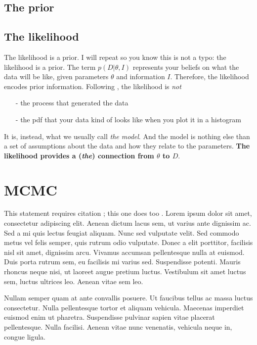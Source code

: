 \documentclass[a4paper,11pt]{article}
\begin{document}
\subsection{The prior}\label{sec:prior}

\subsection{The likelihood}\label{sec:likelihood}

The likelihood is a prior.
I will repeat so you know this is not a typo: the likelihood is a prior.
The term $p(D|\theta,I)$ represents your beliefs on what the data will be like, given parameters $\theta$ and information $I$.
Therefore, the likelihood encodes prior information.
%
Following \cite{Brewer2013}, the likelihood is \emph{not} 
\begin{itemize}
	\item[-] the process that generated the data
	\item[-] the pdf that your data kind of looks like when you plot it in a histogram
\end{itemize}

It is, instead, what we usually call \emph{the model}.
And the model is nothing else than a set of assumptions about the data and how they relate to the parameters.
\textbf{The likelihood provides a (\emph{the}) connection from $\theta$ to $D$}.




\section{MCMC}

This statement requires citation \cite{Smith:2012qr}; this one does too \cite{Smith:2013jd}. Lorem ipsum dolor sit amet, consectetur adipiscing elit. Aenean dictum lacus sem, ut varius ante dignissim ac. Sed a mi quis lectus feugiat aliquam. Nunc sed vulputate velit. Sed commodo metus vel felis semper, quis rutrum odio vulputate. Donec a elit porttitor, facilisis nisl sit amet, dignissim arcu. Vivamus accumsan pellentesque nulla at euismod. Duis porta rutrum sem, eu facilisis mi varius sed. Suspendisse potenti. Mauris rhoncus neque nisi, ut laoreet augue pretium luctus. Vestibulum sit amet luctus sem, luctus ultrices leo. Aenean vitae sem leo.

Nullam semper quam at ante convallis posuere. Ut faucibus tellus ac massa luctus consectetur. Nulla pellentesque tortor et aliquam vehicula. Maecenas imperdiet euismod enim ut pharetra. Suspendisse pulvinar sapien vitae placerat pellentesque. Nulla facilisi. Aenean vitae nunc venenatis, vehicula neque in, congue ligula.
\end{document}
